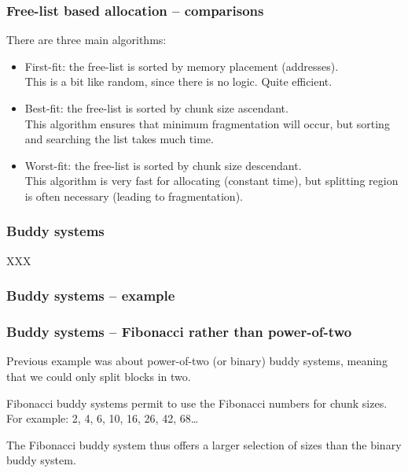 
\begin{frame}
  \frametitle{Free-list based allocation -- comparisons}

  There are three main algorithms:

  \begin{itemize}
  \item
    First-fit: the free-list is sorted by memory placement (addresses).\\
    This is a bit like random, since there is no logic. Quite efficient.
  \item
    Best-fit: the free-list is sorted by chunk size ascendant.\\
    This algorithm ensures that minimum fragmentation will occur, but
    sorting and searching the list takes much time.
  \item
    Worst-fit: the free-list is sorted by chunk size descendant.\\
    This algorithm is very fast for allocating (constant time), but
    splitting region is often necessary (leading to fragmentation).
  \end{itemize}

\end{frame}


\begin{frame}
  \frametitle{Buddy systems}

  XXX

\end{frame}


\begin{frame}
  \frametitle{Buddy systems -- example}

  \begin{center}
  \end{center}

\end{frame}


\begin{frame}
  \frametitle{Buddy systems -- Fibonacci rather than power-of-two}

  Previous example was about power-of-two (or binary) buddy systems,
  meaning that we could only split blocks in two.

  \-

  Fibonacci buddy systems permit to use the Fibonacci numbers for
  chunk sizes. For example: 2, 4, 6, 10, 16, 26, 42, 68\ldots

  \-

  The Fibonacci buddy system thus offers a larger selection of sizes
  than the binary buddy system.

\end{frame}

